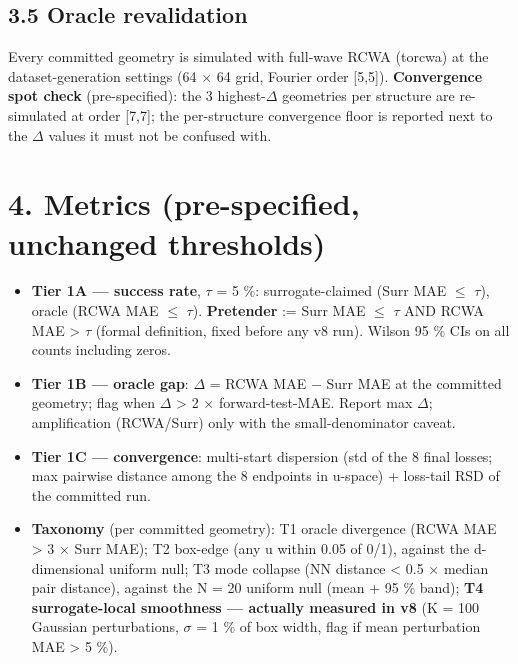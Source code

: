 \documentclass[11pt,a4paper]{article}
\providecommand{\tightlist}{\setlength{\itemsep}{0pt}\setlength{\parskip}{0pt}}
\begin{document}
\subsection*{3.5 Oracle revalidation}

Every committed geometry is simulated with full-wave RCWA (torcwa) at the
dataset-generation settings (64 \ensuremath{\times} 64 grid, Fourier order {[}5,5{]}).
\textbf{Convergence spot check} (pre-specified): the 3 highest-\ensuremath{\Delta} geometries per
structure are re-simulated at order {[}7,7{]}; the per-structure convergence floor
is reported next to the \ensuremath{\Delta} values it must not be confused with.

\section*{4. Metrics (pre-specified, unchanged thresholds)}

\begin{itemize}
\tightlist
\item
  \textbf{Tier 1A --- success rate}, \ensuremath{\tau} = 5 \%: surrogate-claimed (Surr MAE \ensuremath{\leq} \ensuremath{\tau}),
  oracle (RCWA MAE \ensuremath{\leq} \ensuremath{\tau}). \textbf{Pretender} := Surr MAE \ensuremath{\leq} \ensuremath{\tau} AND RCWA MAE \textgreater{} \ensuremath{\tau}
  (formal definition, fixed before any v8 run). Wilson 95 \% CIs on all counts
  including zeros.
\item
  \textbf{Tier 1B --- oracle gap}: \ensuremath{\Delta} = RCWA MAE \ensuremath{-} Surr MAE at the committed geometry;
  flag when \ensuremath{\Delta} \textgreater{} 2 \ensuremath{\times} forward-test-MAE. Report max \ensuremath{\Delta}; amplification
  (RCWA/Surr) only with the small-denominator caveat.
\item
  \textbf{Tier 1C --- convergence}: multi-start dispersion (std of the 8 final losses;
  max pairwise distance among the 8 endpoints in u-space) + loss-tail RSD of
  the committed run.
\item
  \textbf{Taxonomy} (per committed geometry): T1 oracle divergence
  (RCWA MAE \textgreater{} 3 \ensuremath{\times} Surr MAE); T2 box-edge (any u within 0.05 of 0/1), against
  the d-dimensional uniform null; T3 mode collapse (NN distance \textless{} 0.5 \ensuremath{\times} median
  pair distance), against the N = 20 uniform null (mean + 95 \% band);
  \textbf{T4 surrogate-local smoothness --- actually measured in v8} (K = 100
  Gaussian perturbations, \ensuremath{\sigma} = 1 \% of box width, flag if mean perturbation
  MAE \textgreater{} 5 \%).
\end{itemize}
\end{document}
